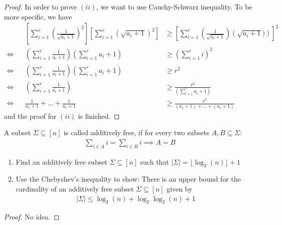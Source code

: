 \begin{proof}
  In order to prove $(ii)$, we want to use Cauchy-Schwarz inequality. To be more specific, we have 
  \begin{align*}
    && \left[ \sum_{i = 1}^{r} \left( \frac{1}{\sqrt{a_{i} + 1}} \right)^{2} \right] \left[ \sum_{i = 1}^{r} \left( \sqrt{a_{i} + 1} \right)^{2} \right] &\geq \left[ \sum_{i = 1}^{r} \left( \frac{1}{\sqrt{a_{i} + 1}} \right) \left( \sqrt{a_{i} + 1}) \right) \right]^{2} \\
    \Leftrightarrow && \left( \sum_{i = 1}^{r} \frac{1}{a_{i} + 1} \right) \left( \sum_{i = 1}^{r} a_{i} + 1 \right) &\geq \left( \sum_{i=1}^{r} i \right)^{2} \\
    \Leftrightarrow && \left( \sum_{i = 1}^{r} \frac{1}{a_{i} + 1} \right) \left( \sum_{i = 1}^{r} a_{i} + 1 \right) &\geq r^{2} \\ 
    \Leftrightarrow && \left( \sum_{i = 1}^{r} \frac{1}{a_{i} + 1} \right) &\geq \frac{r^{2}}{\left( \sum_{i = 1}^{r} a_{i} + 1 \right)} \\
    \Leftrightarrow && \frac{1}{a_{1} + 1} + \ldots + \frac{1}{a_{r} + 1} &\geq \frac{r^{2}}{(a_{1} + 1) + \ldots + (a_{r} + 1)}
  \end{align*}
  and the proof for $(ii)$ is finished.
\end{proof}

\begin{problem}
  A subset $\Sigma \subseteq [n]$ is called additively free, if for every two subsets $A,B \subseteq \Sigma$:
  \begin{align*}
    \sum_{i \in A} i = \sum_{i \in B} i \implies A = B
  \end{align*}
  \begin{enumerate}[label=(\roman*)]
    \item Find an additively free subset $\Sigma \subseteq [n]$ such that $|\Sigma| = \lfloor \log_{2}(n) \rfloor + 1$
    \item Use the Chebyshev's inequality to show: There is an upper bound for the cardinality of an additively free subset $\Sigma \subseteq [n]$ given by
      \begin{align*}
        |\Sigma| \leq \log_{2}(n) + \log_{2} \log_{2}(n) + 1
      \end{align*}
  \end{enumerate}
\end{problem}
\begin{proof}
  No idea.
\end{proof}



